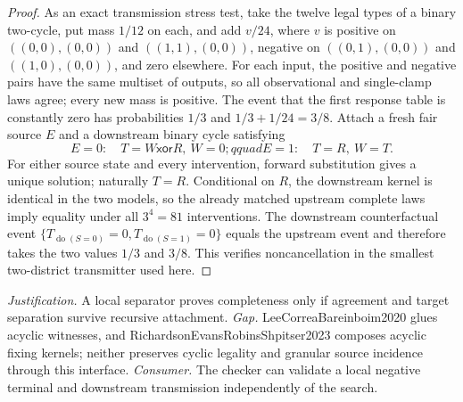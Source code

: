 \documentclass{article}
\begin{document}
\begin{proof}
As an exact transmission stress test, take the twelve legal types of a binary two-cycle, put mass \(1/12\) on each, and add \(v/24\), where \(v\) is positive on \(((0,0),(0,0))\) and \(((1,1),(0,0))\), negative on \(((0,1),(0,0))\) and \(((1,0),(0,0))\), and zero elsewhere.  For each input, the positive and negative pairs have the same multiset of outputs, so all observational and single-clamp laws agree; every new mass is positive.  The event that the first response table is constantly zero has probabilities \(1/3\) and \(1/3+1/24=3/8\).  Attach a fresh fair source \(E\) and a downstream binary cycle satisfying
\[
 E=0:\quad T=W\mathbin{\mathsf{xor}}R,\ W=0;qquad
 E=1:\quad T=R,\ W=T.
\]
For either source state and every intervention, forward substitution gives a unique solution; naturally \(T=R\).  Conditional on \(R\), the downstream kernel is identical in the two models, so the already matched upstream complete laws imply equality under all \(3^4=81\) interventions.  The downstream counterfactual event \(\{T_{\operatorname{do}(S=0)}=0,T_{\operatorname{do}(S=1)}=0\}\) equals the upstream event and therefore takes the two values \(1/3\) and \(3/8\).  This verifies noncancellation in the smallest two-district transmitter used here.
\end{proof}
\par\smallskip\noindent \textit{Justification.} A local separator proves completeness only if agreement and target separation survive recursive attachment. \textit{Gap.} LeeCorreaBareinboim2020 glues acyclic witnesses, and RichardsonEvansRobinsShpitser2023 composes acyclic fixing kernels; neither preserves cyclic legality and granular source incidence through this interface. \textit{Consumer.} The checker can validate a local negative terminal and downstream transmission independently of the search.
\end{document}
